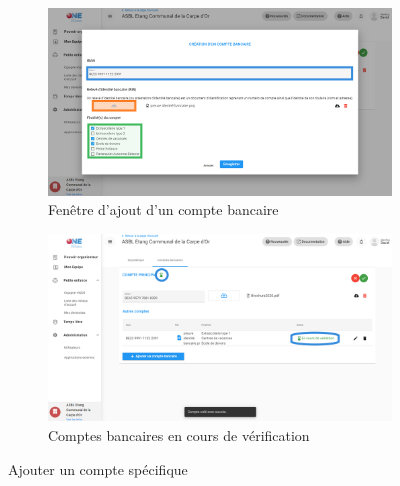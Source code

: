 \begin{figure}[!h]
    \centering
    \begin{subfigure}[t]{0.49\textwidth}
    \centering
    \includegraphics[width=\textwidth]{Images/gcb/gcb_autrecomptecreate.png}
    \caption{Fenêtre d'ajout d'un compte bancaire}
    \label{test1}
     \end{subfigure}
    \hfill
    \begin{subfigure}[t]{0.49\textwidth}
         \centering
         \includegraphics[width=\textwidth]{Images/gcb/gcb_comptesbancairesenvalidation.png}
         \caption{Comptes bancaires en cours de vérification}
     \end{subfigure}       
     
    \caption{Ajouter un compte spécifique}
    \label{fig:gestion_comptes_spécifique}
\end{figure}
